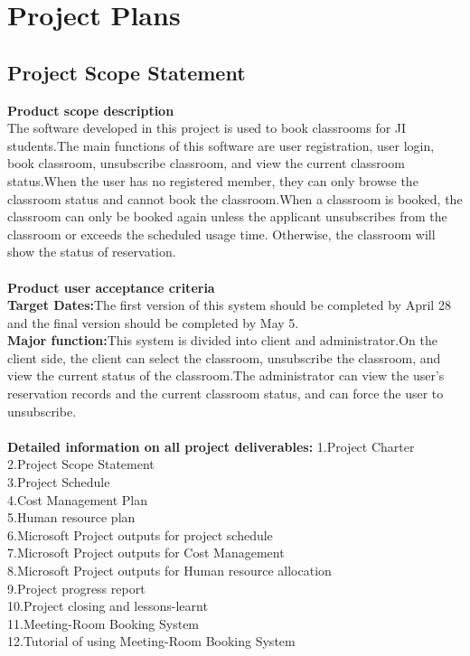 \documentclass[runningheads]{llncs}
\begin{document}
\section{Project Plans}
\subsection{Project Scope Statement}
\textbf{Product scope description}\\
The software developed in this project is used to book classrooms for JI students.The main functions of this software are user registration, user login, book classroom, unsubscribe classroom, and view the current classroom status.When the user has no registered member, they can only browse the classroom status and cannot book the classroom.When a classroom is booked, the classroom can only be booked again unless the applicant unsubscribes from the classroom or exceeds the scheduled usage time. Otherwise, the classroom will show the status of reservation.\\\\
\textbf{Product user acceptance criteria}\\
\textbf{Target Dates:}The first version of this system should be completed by April 28 and the final version should be completed by May 5.\\
\textbf{Major function:}This system is divided into client and administrator.On the client side, the client can select the classroom, unsubscribe the classroom, and view the current status of the classroom.The administrator can view the user's reservation records and the current classroom status, and can force the user to unsubscribe.\\\\
\textbf{Detailed information on all project deliverables:}
1.Project Charter\\
2.Project Scope Statement\\
3.Project Schedule\\
4.Cost Management Plan\\
5.Human resource plan\\
6.Microsoft Project outputs for project schedule\\
7.Microsoft Project outputs for Cost Management\\
8.Microsoft Project outputs for Human resource allocation\\
9.Project progress report\\
10.Project closing and lessons-learnt\\
11.Meeting-Room Booking System\\
12.Tutorial of using Meeting-Room Booking System\\
\end{document}
